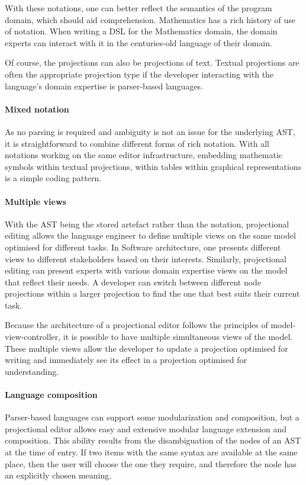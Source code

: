 With these notations, one can better reflect the semantics of the program domain, which should aid comprehension.
Mathematics has a rich history of use of notation.
When writing a DSL for the Mathematics domain, the domain experts can interact with it in the centuries-old language of their domain.

Of course, the projections can also be projections of text.
Textual projections are often the appropriate projection type if the developer interacting with the language's domain expertise is parser-based languages.

\paragraph{Mixed notation}
As no parsing is required and ambiguity is not an issue for the underlying AST, it is straightforward to combine different forms of rich notation.
With all notations working on the same editor infrastructure, embedding mathematic symbols within textual projections, within tables within graphical representations is a simple coding pattern.

\paragraph{Multiple views}
With the AST being the stored artefact rather than the notation, projectional editing allows the language engineer to define multiple views on the same model optimised for different tasks.
In Software architecture, one presents different views to different stakeholders based on their interests.
Similarly, projectional editing can present experts with various domain expertise views on the model that reflect their needs.
A developer can switch between different node projections within a larger projection to find the one that best suits their current task.

Because the architecture of a projectional editor follows the principles of model-view-controller, it is possible to have multiple simultaneous views of the model.
These multiple views allow the developer to update a projection optimised for writing and immediately see its effect in a projection optimised for understanding.

\paragraph{Language composition}
Parser-based languages can support some modularization and composition, but a projectional editor allows easy and extensive modular language extension and composition.
This ability results from the disambiguation of the nodes of an AST at the time of entry.
If two items with the same syntax are available at the same place, then the user will choose the one they require, and therefore the node has an explicitly chosen meaning.

